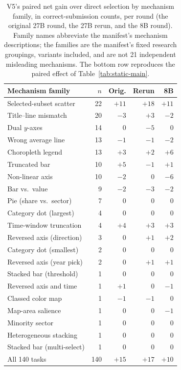 \begin{table}[t]
\centering
\small
\setlength{\tabcolsep}{4pt}
\begin{tabular}{lrrrr}
\toprule
Mechanism family & $n$ & Orig. & Rerun & 8B \\
\midrule
Selected-subset scatter & 22 & $+11$ & $+18$ & $+11$ \\
Title--line mismatch & 20 & $-3$ & $+3$ & $-2$ \\
Dual $y$-axes & 14 & $0$ & $-5$ & $0$ \\
Wrong average line & 13 & $-1$ & $-1$ & $-2$ \\
Choropleth legend & 13 & $+3$ & $+2$ & $+6$ \\
Truncated bar & 10 & $+5$ & $-1$ & $+1$ \\
Non-linear axis & 10 & $-2$ & $0$ & $-6$ \\
Bar vs.\ value & 9 & $-2$ & $-3$ & $-2$ \\
Pie (share vs.\ sector) & 7 & $0$ & $0$ & $0$ \\
Category dot (largest) & 4 & $0$ & $0$ & $0$ \\
Time-window truncation & 4 & $+4$ & $+3$ & $+3$ \\
Reversed axis (direction) & 3 & $0$ & $+1$ & $+2$ \\
Category dot (smallest) & 2 & $0$ & $0$ & $0$ \\
Reversed axis (year pick) & 2 & $0$ & $+1$ & $+1$ \\
Stacked bar (threshold) & 1 & $0$ & $0$ & $0$ \\
Reversed axis and time & 1 & $+1$ & $0$ & $-1$ \\
Classed color map & 1 & $-1$ & $-1$ & $0$ \\
Map-area salience & 1 & $0$ & $0$ & $-1$ \\
Minority sector & 1 & $0$ & $0$ & $0$ \\
Heterogeneous stacking & 1 & $0$ & $0$ & $0$ \\
Stacked bar (multi-select) & 1 & $0$ & $0$ & $0$ \\
\midrule
All 140 tasks & 140 & $+15$ & $+17$ & $+10$ \\
\bottomrule
\end{tabular}
\caption{V5's paired net gain over direct selection by
mechanism family, in correct-submission counts, per
round (the original 27B round, the 27B rerun, and the
8B round). Family names abbreviate the manifest's
mechanism descriptions; the families are the manifest's
fixed research groupings, variants included, and are
not 21 independent misleading mechanisms. The bottom
row reproduces the paired effect of
Table~\ref{tab:static-main}.}
\label{tab:family-strat}
\end{table}

